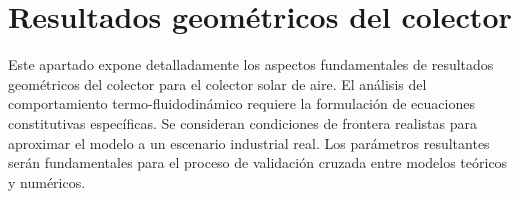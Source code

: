 \section{Resultados geométricos del colector}
\label{sec:cap09_geometricos}

Este apartado expone detalladamente los aspectos fundamentales de resultados geométricos del colector para el colector solar de aire.
El análisis del comportamiento termo-fluidodinámico requiere la formulación de ecuaciones constitutivas específicas.
Se consideran condiciones de frontera realistas para aproximar el modelo a un escenario industrial real.
Los parámetros resultantes serán fundamentales para el proceso de validación cruzada entre modelos teóricos y numéricos.
